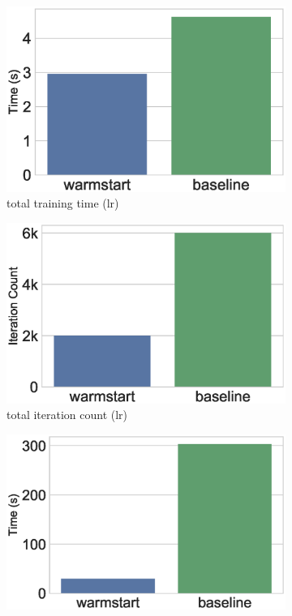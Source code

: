\begin{figure}
\centering
\begin{subfigure}{.5\linewidth}
  \includegraphics[width=\linewidth]{../images/experiment-results/warmstarting-lr-5981-runtime.eps}
  \caption{total training time (lr)}
  \label{fig:sub1}
\end{subfigure}%
\begin{subfigure}{.5\linewidth}
  \includegraphics[width=\linewidth]{../images/experiment-results/warmstarting-lr-5981-iterations.eps}
  \caption{total iteration count (lr)}
  \label{fig:sub1}
\end{subfigure}
\begin{subfigure}{.5\linewidth}
  \includegraphics[width=\linewidth]{../images/experiment-results/warmstarting-rf-8568-time.eps}

\end{subfigure}
\end{figure}
